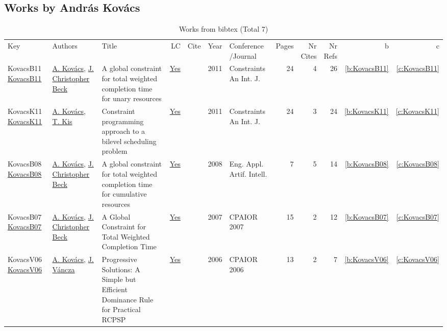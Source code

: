 \subsection{Works by Andr{\'{a}}s Kov{\'{a}}cs}
\label{sec:a147}
{\scriptsize
\begin{longtable}{>{\raggedright\arraybackslash}p{3cm}>{\raggedright\arraybackslash}p{6cm}>{\raggedright\arraybackslash}p{6.5cm}rrrp{2.5cm}rrrrr}
\rowcolor{white}\caption{Works from bibtex (Total 7)}\\ \toprule
\rowcolor{white}Key & Authors & Title & LC & Cite & Year & \shortstack{Conference\\/Journal} & Pages & \shortstack{Nr\\Cites} & \shortstack{Nr\\Refs} & b & c \\ \midrule\endhead
\bottomrule
\endfoot
KovacsB11 \href{https://doi.org/10.1007/s10601-009-9088-x}{KovacsB11} & \hyperref[auth:a147]{A. Kov{\'{a}}cs}, \hyperref[auth:a89]{J. Christopher Beck} & A global constraint for total weighted completion time for unary resources & \href{works/KovacsB11.pdf}{Yes} & \cite{KovacsB11} & 2011 & Constraints An Int. J. & 24 & 4 & 26 & \ref{b:KovacsB11} & \ref{c:KovacsB11}\\
KovacsK11 \href{https://doi.org/10.1007/s10601-010-9102-3}{KovacsK11} & \hyperref[auth:a147]{A. Kov{\'{a}}cs}, \hyperref[auth:a157]{T. Kis} & Constraint programming approach to a bilevel scheduling problem & \href{works/KovacsK11.pdf}{Yes} & \cite{KovacsK11} & 2011 & Constraints An Int. J. & 24 & 3 & 24 & \ref{b:KovacsK11} & \ref{c:KovacsK11}\\
KovacsB08 \href{https://doi.org/10.1016/j.engappai.2008.03.004}{KovacsB08} & \hyperref[auth:a147]{A. Kov{\'{a}}cs}, \hyperref[auth:a89]{J. Christopher Beck} & A global constraint for total weighted completion time for cumulative resources & \href{works/KovacsB08.pdf}{Yes} & \cite{KovacsB08} & 2008 & Eng. Appl. Artif. Intell. & 7 & 5 & 14 & \ref{b:KovacsB08} & \ref{c:KovacsB08}\\
KovacsB07 \href{https://doi.org/10.1007/978-3-540-72397-4\_9}{KovacsB07} & \hyperref[auth:a147]{A. Kov{\'{a}}cs}, \hyperref[auth:a89]{J. Christopher Beck} & A Global Constraint for Total Weighted Completion Time & \href{works/KovacsB07.pdf}{Yes} & \cite{KovacsB07} & 2007 & CPAIOR 2007 & 15 & 2 & 12 & \ref{b:KovacsB07} & \ref{c:KovacsB07}\\
KovacsV06 \href{https://doi.org/10.1007/11757375\_13}{KovacsV06} & \hyperref[auth:a147]{A. Kov{\'{a}}cs}, \hyperref[auth:a281]{J. V{\'{a}}ncza} & Progressive Solutions: {A} Simple but Efficient Dominance Rule for Practical {RCPSP} & \href{works/KovacsV06.pdf}{Yes} & \cite{KovacsV06} & 2006 & CPAIOR 2006 & 13 & 2 & 7 & \ref{b:KovacsV06} & \ref{c:KovacsV06}\\

\end{longtable}}
